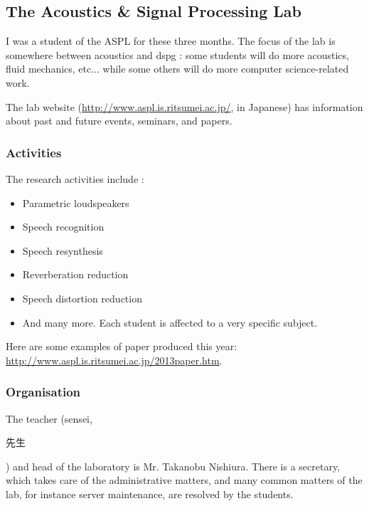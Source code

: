 \subsection{The Acoustics \& Signal Processing Lab}
I was a student of the \ac{ASPL} for these three months. The focus of the lab is somewhere between acoustics and \ac{dspg} : some students will do more acoustics, fluid mechanics, etc...  while some others will do more computer science-related work.

The lab website (\url{http://www.aspl.is.ritsumei.ac.jp/}, in Japanese) has information about past and future events, seminars, and papers. 
\subsubsection{Activities}
The research activities include :
\begin{itemize}
\item Parametric loudspeakers
\item Speech recognition
\item Speech resynthesis
\item Reverberation reduction
\item Speech distortion reduction
\item And many more. Each student is affected to a very specific subject.
\end{itemize}
Here are some examples of paper produced this year: \url{http://www.aspl.is.ritsumei.ac.jp/2013paper.htm}.

\subsubsection{Organisation}
The teacher (sensei, \begin{CJK}{UTF8}{min}先生\end{CJK}) and head of the laboratory is Mr. Takanobu Nishiura. There is a secretary, which takes care of the administrative matters, and many common matters of the lab, for instance server maintenance, are resolved by the students.